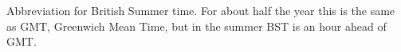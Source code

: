 Abbreviation for British Summer time. For about half the 
year this is the same as GMT, Greenwich Mean Time, but in 
the summer BST is an hour ahead of GMT.

